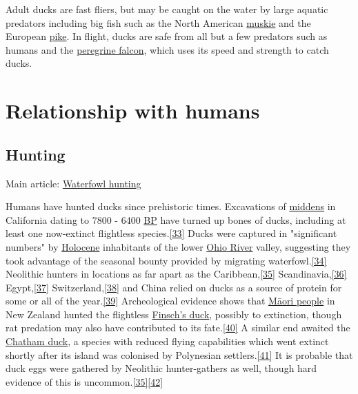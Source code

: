 \documentclass[11pt,a4paper]{article}
\begin{document}
Adult ducks are fast fliers, but may be caught on the water by large aquatic predators including big fish such as the North American \href{/wiki/Muskellunge}{muskie} and the European \href{/wiki/Esox}{pike}. In flight, ducks are safe from all but a few predators such as humans and the \href{/wiki/Peregrine\_falcon}{peregrine falcon}, which uses its speed and strength to catch ducks.

\section{Relationship with humans}

\subsection{Hunting}

Main article: \href{/wiki/Waterfowl\_hunting}{Waterfowl hunting}

Humans have hunted ducks since prehistoric times. Excavations of \href{/wiki/Midden}{middens} in California dating to 7800 - 6400 \href{/wiki/Before\_present}{BP} have turned up bones of ducks, including at least one now-extinct flightless species.\href{\#cite\_note-FOOTNOTEErlandson1994171-33}{[33]} Ducks were captured in "significant numbers" by \href{/wiki/Holocene}{Holocene} inhabitants of the lower \href{/wiki/Ohio\_River}{Ohio River} valley, suggesting they took advantage of the seasonal bounty provided by migrating waterfowl.\href{\#cite\_note-FOOTNOTEJeffries2008168,\_243-34}{[34]} Neolithic hunters in locations as far apart as the Caribbean,\href{\#cite\_note-FOOTNOTESued-Badillo200365-35}{[35]} Scandinavia,\href{\#cite\_note-FOOTNOTEThorpe199668-36}{[36]} Egypt,\href{\#cite\_note-FOOTNOTEMaisels199942-37}{[37]} Switzerland,\href{\#cite\_note-FOOTNOTERau1876133-38}{[38]} and China relied on ducks as a source of protein for some or all of the year.\href{\#cite\_note-FOOTNOTEHigman201223-39}{[39]} Archeological evidence shows that \href{/wiki/M\%C4\%81ori\_people}{Māori people} in New Zealand hunted the flightless \href{/wiki/Finsch\%27s\_duck}{Finsch's duck}, possibly to extinction, though rat predation may also have contributed to its fate.\href{\#cite\_note-FOOTNOTEHume201253-40}{[40]} A similar end awaited the \href{/wiki/Chatham\_duck}{Chatham duck}, a species with reduced flying capabilities which went extinct shortly after its island was colonised by Polynesian settlers.\href{\#cite\_note-FOOTNOTEHume201252-41}{[41]} It is probable that duck eggs were gathered by Neolithic hunter-gathers as well, though hard evidence of this is uncommon.\href{\#cite\_note-FOOTNOTESued-Badillo200365-35}{[35]}\href{\#cite\_note-FOOTNOTEFieldhouse2002167-42}{[42]}
\end{document}
